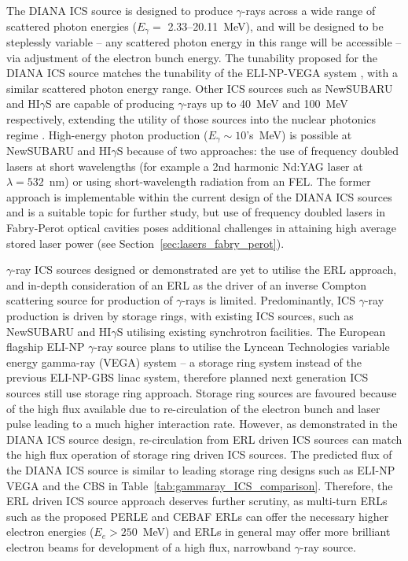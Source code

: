 \documentclass[../main.tex]{subfiles}
\begin{document}
The DIANA ICS source is designed to produce $\gamma$-rays across a wide range of scattered photon energies ($E_{\gamma}=$ 2.33--20.11~\si{\mega\electronvolt}), and will be designed to be steplessly variable -- any scattered photon energy in this range will be accessible -- via adjustment of the electron bunch energy. The tunability proposed for the DIANA ICS source matches the tunability of the ELI-NP-VEGA system \cite{tanaka2020current,elinp2019vega}, with a similar scattered photon energy range. Other ICS sources such as NewSUBARU and HI$\gamma$S are capable of producing $\gamma$-rays up to 40~\si{\mega\electronvolt} and 100~\si{\mega\electronvolt} respectively, extending the utility of those sources into the nuclear photonics regime \cite{budker2021expanding}. High-energy photon production ($E_{\gamma}\sim 10$'s~\si{\mega\electronvolt}) is possible at NewSUBARU and HI$\gamma$S because of two approaches: the use of frequency doubled lasers at short wavelengths (for example a 2nd harmonic Nd:YAG laser at $\lambda = 532$~\si{\nano\meter}) or using short-wavelength radiation from an FEL. The former approach is implementable within the current design of the DIANA ICS sources and is a suitable topic for further study, but use of frequency doubled lasers in Fabry-Perot optical cavities poses additional challenges in attaining high average stored laser power (see Section~\ref{sec:lasers_fabry_perot}).

$\gamma$-ray ICS sources designed or demonstrated are yet to utilise the ERL approach, and in-depth consideration of an ERL as the driver of an inverse Compton scattering source for production of $\gamma$-rays is limited. Predominantly, ICS $\gamma$-ray production is driven by storage rings, with existing ICS sources, such as NewSUBARU \cite{utsunomiya2015gamma} and HI$\gamma$S \cite{weller2009research} utilising existing synchrotron facilities. The European flagship ELI-NP $\gamma$-ray source plans to utilise the Lyncean Technologies variable energy gamma-ray (VEGA) system \cite{tanaka2020current,elinp2019vega} -- a storage ring system instead of the previous ELI-NP-GBS \cite{adriani2014technical} linac system, therefore planned next generation ICS sources still use storage ring approach. Storage ring sources are favoured because of the high flux available due to re-circulation of the electron bunch and laser pulse leading to a much higher interaction rate. However, as demonstrated in the DIANA ICS source design, re-circulation from ERL driven ICS sources can match the high flux operation of storage ring driven ICS sources. The predicted flux of the DIANA ICS source is similar to leading storage ring designs such as ELI-NP VEGA and the CBS \cite{pan2019design} in Table~\ref{tab:gammaray_ICS_comparison}. Therefore, the ERL driven ICS source approach deserves further scrutiny, as multi-turn ERLs such as the proposed PERLE \cite{angal2018perle} and CEBAF \cite{meot2016er} ERLs can offer the necessary higher electron energies ($E_{e} > 250$~\si{\mega\electronvolt}) and ERLs in general may offer more brilliant electron beams \cite{adolphsen2022european} for development of a high flux, narrowband $\gamma$-ray source. 
\end{document}
